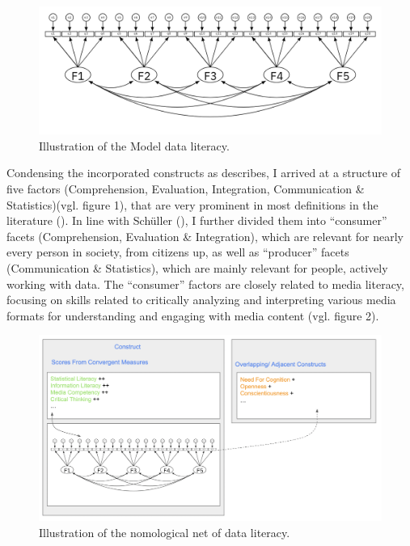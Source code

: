 \documentclass[
  12pt,
  a4paper,
  twoside]{article}
\begin{document}
\begin{figure}

{\centering \includegraphics[width=1\linewidth]{images/Models_MA} 

}

\caption{Illustration of the Model data literacy.  }\label{fig:model1}
\end{figure}

Condensing the incorporated constructs as describes, I arrived at a structure of five factors (Comprehension, Evaluation, Integration, Communication \& Statistics)(vgl. figure 1), that are very prominent in most definitions in the literature (). In line with Schüller (), I further divided them into ``consumer'' facets (Comprehension, Evaluation \& Integration), which are relevant for nearly every person in society, from citizens up, as well as ``producer'' facets (Communication \& Statistics), which are mainly relevant for people, actively working with data. The ``consumer'' factors are closely related to media literacy, focusing on skills related to critically analyzing and interpreting various media formats for understanding and engaging with media content (vgl. figure 2).

\begin{figure}

{\centering \includegraphics[width=1\linewidth]{images/DL_NomNet} 

}

\caption{Illustration of the nomological net of data literacy.  }\label{fig:nomnet}
\end{figure}
\end{document}
